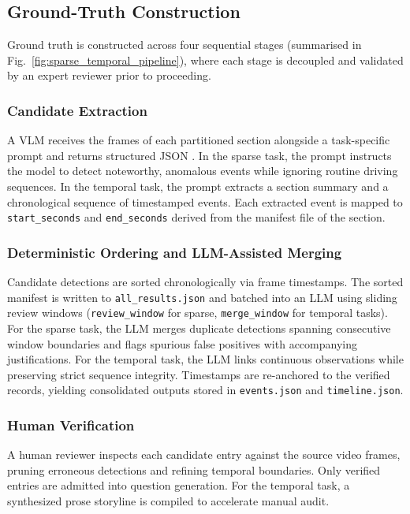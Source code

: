 \documentclass[journal]{IEEEtran}
\begin{document}
\subsection{Ground-Truth Construction}

Ground truth is constructed across four sequential stages (summarised in Fig.~\ref{fig:sparse_temporal_pipeline}), where each stage is decoupled and validated by an expert reviewer prior to proceeding.

\subsubsection{Candidate Extraction}
A VLM receives the frames of each partitioned section alongside a task-specific prompt and returns structured JSON \cite{burnett2023boreas}. In the sparse task, the prompt instructs the model to detect noteworthy, anomalous events while ignoring routine driving sequences. In the temporal task, the prompt extracts a section summary and a chronological sequence of timestamped events. Each extracted event is mapped to \texttt{start\_seconds} and \texttt{end\_seconds} derived from the manifest file of the section.

\subsubsection{Deterministic Ordering and LLM-Assisted Merging}
Candidate detections are sorted chronologically via frame timestamps. The sorted manifest is written to \texttt{all\_results.json} and batched into an LLM using sliding review windows (\texttt{review\_window} for sparse, \texttt{merge\_window} for temporal tasks). For the sparse task, the LLM merges duplicate detections spanning consecutive window boundaries and flags spurious false positives with accompanying justifications. For the temporal task, the LLM links continuous observations while preserving strict sequence integrity. Timestamps are re-anchored to the verified records, yielding consolidated outputs stored in \texttt{events.json} and \texttt{timeline.json}.

\subsubsection{Human Verification}
A human reviewer inspects each candidate entry against the source video frames, pruning erroneous detections and refining temporal boundaries. Only verified entries are admitted into question generation. For the temporal task, a synthesized prose storyline is compiled to accelerate manual audit.
\end{document}
